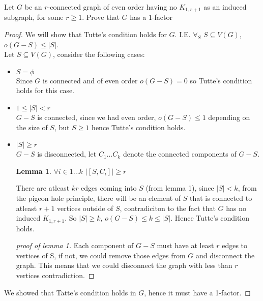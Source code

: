 \documentclass[12pt]{article}
\newtheorem{lemma}[theorem]{Lemma}
\newenvironment{problem}[2][Problem]{\begin{trivlist}
\item[\hskip\labelsep{\bfseries #1}\hskip\labelsep{\bfseries #2.}]}{\end{trivlist}}
\begin{document}
\begin{problem}{4}
  Let $G$ be an $r$-connected graph of even order having no $K_{1,r+1}$ as an
  induced subgraph, for some $r \ge 1$. Prove that $G$ has a $1$-factor
\end{problem}
\begin{proof}
  We will show that Tutte's condition holds for $G$. I.E. $\forall_S$ $S \subseteq
  V(G)$, $o(G - S) \le |S|$.\\
  Let $S \subseteq V(G)$, consider the following cases:
  \begin{itemize}
    \item{$S = \phi$}\\
      Since $G$ is connected and of even order $o(G-S) = 0$ so Tutte's condition
      holds for this case.
    \item{$ 1 \le |S| < r$}\\
      $G - S$ is connected, since we had even order, $o(G-S) \le 1$ depending on
      the size of $S$, but $S \ge 1$ hence Tutte's condition holds.
    \item{$|S| \ge r$}\\
      $G-S$ is disconnected, let $C_1 \ldots C_k$ denote the connected
      components of $G-S$.
      \begin{lemma} 
        $\forall i \in {1 \ldots k}$ $|[S, C_i]| \ge r$
      \end{lemma}
      There are atleast $kr$ edges coming into $S$ (from lemma 1), since $|S| <
      k$, from the pigeon hole principle, there will be an element of $S$ that
      is connected to atleast $r + 1$ vertices outside of $S$, contradiciton to
      the fact that $G$ has no induced $K_{1, r+1}$. So $|S| \ge k$, $o(G - S)
      \le k \le |S|$. Hence Tutte's condition holds.
      \begin{proof}[proof of lemma 1]
        Each component of $G - S$ must have at least $r$ edges to vertices of S,
        if not, we could remove those edges from $G$ and disconnect the graph.
        This means that we could disconnect the graph with less than $r$ vertices
        contradiction.
      \end{proof}
  \end{itemize}
  We showed that Tatte's condition holds in $G$, hence it must have a 1-factor.
\end{proof}
\end{document}
